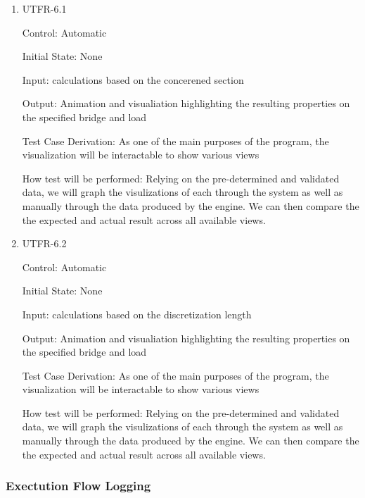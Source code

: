 \documentclass[12pt, titlepage]{article}
\begin{document}
\begin{enumerate}

\item{UTFR-6.1\\}

Control: Automatic
				
Initial State: None
					
Input: calculations based on the concerened section 
					
Output: Animation and visualiation highlighting the resulting properties on the specified bridge and load 

Test Case Derivation: As one of the main purposes of the program, the visualization will be interactable to show various views

How test will be performed: Relying on the pre-determined and validated data, we will graph the visulizations of each through the system as well as manually through the data produced by the engine. We can then compare the the expected and actual result across all available views. 
					
\item{UTFR-6.2\\}

Control: Automatic
					
Initial State: None
					
Input: calculations based on the discretization length 
					
Output:  Animation and visualiation highlighting the resulting properties on the specified bridge and load 

Test Case Derivation: As one of the main purposes of the program, the visualization will be interactable to show various views

How test will be performed: Relying on the pre-determined and validated data, we will graph the visulizations of each through the system as well as manually through the data produced by the engine. We can then compare the the expected and actual result across all available views. 

\end{enumerate}

\subsubsection{Exectution Flow Logging}
\end{document}

